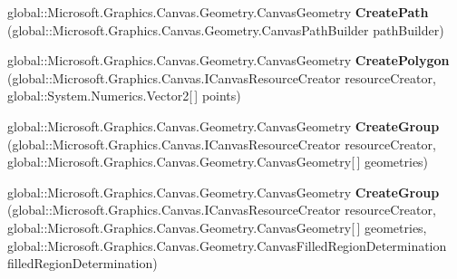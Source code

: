 \begin{DoxyCompactItemize}
\item 
\mbox{\label{interface_microsoft_1_1_graphics_1_1_canvas_1_1_geometry_1_1_i_canvas_geometry_statics_a9b464d06c47609c3d62de903eb4c611e}} 
global\+::\+Microsoft.\+Graphics.\+Canvas.\+Geometry.\+Canvas\+Geometry {\bfseries Create\+Path} (global\+::\+Microsoft.\+Graphics.\+Canvas.\+Geometry.\+Canvas\+Path\+Builder path\+Builder)
\item 
\mbox{\label{interface_microsoft_1_1_graphics_1_1_canvas_1_1_geometry_1_1_i_canvas_geometry_statics_aad896d1f9173e8b37733e3174e9e0321}} 
global\+::\+Microsoft.\+Graphics.\+Canvas.\+Geometry.\+Canvas\+Geometry {\bfseries Create\+Polygon} (global\+::\+Microsoft.\+Graphics.\+Canvas.\+I\+Canvas\+Resource\+Creator resource\+Creator, global\+::\+System.\+Numerics.\+Vector2\mbox{[}$\,$\mbox{]} points)
\item 
\mbox{\label{interface_microsoft_1_1_graphics_1_1_canvas_1_1_geometry_1_1_i_canvas_geometry_statics_af80ea6b6f5c0b36d0284b7ea487eaafd}} 
global\+::\+Microsoft.\+Graphics.\+Canvas.\+Geometry.\+Canvas\+Geometry {\bfseries Create\+Group} (global\+::\+Microsoft.\+Graphics.\+Canvas.\+I\+Canvas\+Resource\+Creator resource\+Creator, global\+::\+Microsoft.\+Graphics.\+Canvas.\+Geometry.\+Canvas\+Geometry\mbox{[}$\,$\mbox{]} geometries)
\item 
\mbox{\label{interface_microsoft_1_1_graphics_1_1_canvas_1_1_geometry_1_1_i_canvas_geometry_statics_a12df4abd73ae08fddb2cd7e68c84a78b}} 
global\+::\+Microsoft.\+Graphics.\+Canvas.\+Geometry.\+Canvas\+Geometry {\bfseries Create\+Group} (global\+::\+Microsoft.\+Graphics.\+Canvas.\+I\+Canvas\+Resource\+Creator resource\+Creator, global\+::\+Microsoft.\+Graphics.\+Canvas.\+Geometry.\+Canvas\+Geometry\mbox{[}$\,$\mbox{]} geometries, global\+::\+Microsoft.\+Graphics.\+Canvas.\+Geometry.\+Canvas\+Filled\+Region\+Determination filled\+Region\+Determination)
\item 
\mbox{\label{interface_microsoft_1_1_graphics_1_1_canvas_1_1_geometry_1_1_i_canvas_geometry_statics_ae56dd9130aab9eb22ebd8e54fc87396e}} 

\end{DoxyCompactItemize}

